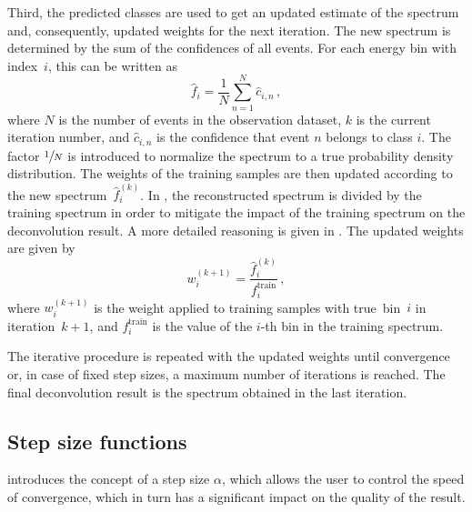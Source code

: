 Third,
the predicted classes are used to
  get an updated estimate of the spectrum
  and,
    consequently,
  updated weights for the next iteration.
%
The new spectrum is determined by the sum of the confidences of all events.
For each energy bin with index~$i$,
this can be written as
\begin{equation}
  \hat f_i = \frac{1}{N} \sum_{n=1}^N \hat c_{i,n} \, ,
\end{equation}
where $N$ is the number of events in the observation dataset,
$k$ is the current iteration number, %
and $\hat c_{i,n}$ is the confidence
  that event $n$ belongs to class $i$.
The factor $\sfrac{1}{N}$ is introduced to normalize the spectrum
to a true probability density distribution.
%
The weights of the training samples are then updated according to the new spectrum~$\hat f_i^{(k)}$. %
In \dseaplus{}, the reconstructed spectrum is divided by the training spectrum %
  in order to mitigate the impact of the training spectrum on the deconvolution result.
A more detailed reasoning is given in \cite{dsea_mirko}.
The updated weights are given by
\begin{equation}
  \label{eqn:dsea:weighting}
  w_i^{(k+1)} = \frac{\hat f_i^{(k)}}{f_i^\text{train}} \, ,
\end{equation}
where $w_i^{(k+1)}$ is the weight applied to training samples with true~bin~$i$ in iteration~$k+1$, %
and $f_i^\text{train}$ is
  the value of the $i$-th bin in
  the training spectrum.


The iterative procedure is repeated
  with the updated weights
until
  convergence
  or,
    in case of fixed step sizes,
  a maximum number of iterations
is reached.
%
%
The final deconvolution result is the spectrum obtained in the last iteration.


\subsection{Step size functions} \label{sec:dsea:dsea:stepsize}
\dseaplus{} introduces the concept of a step size $\alpha$,
which allows the user to control the speed of convergence,
which in turn has a significant impact on the quality of the result.

